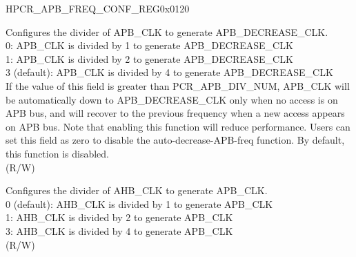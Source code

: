 \begin{register}{H}{PCR\_APB\_FREQ\_CONF\_REG}{0x0120}\label{regdesc:PCRAPBFREQCONFREG}
%
%
%
\regnewline%
\begin{regdesc}\begin{reglist}
 \label{fielddesc:PCRAPBDECREASEDIVNUM}\item [PCR\_APB\_DECREASE\_DIV\_NUM] Configures the divider of APB\_CLK to generate APB\_DECREASE\_CLK.\\
 0: APB\_CLK is divided by 1 to generate APB\_DECREASE\_CLK\\
 1: APB\_CLK is divided by 2 to generate APB\_DECREASE\_CLK\\
 3 (default): APB\_CLK is divided by 4 to generate APB\_DECREASE\_CLK\\
 If the value of this field is greater than PCR\_APB\_DIV\_NUM, APB\_CLK will be automatically down to APB\_DECREASE\_CLK only when no access is on APB bus, and will recover to the previous frequency when a new access appears on APB bus. Note that enabling this function will reduce performance. Users can set this field as zero to disable the auto-decrease-APB-freq function. By default, this function is disabled. 
 \\(R/W)
\label{fielddesc:PCRAPBDIVNUM}\item [PCR\_APB\_DIV\_NUM] Configures the divider of AHB\_CLK to generate APB\_CLK.\\
0 (default): AHB\_CLK is divided by 1 to generate APB\_CLK\\
1: AHB\_CLK is divided by 2 to generate APB\_CLK\\
3: AHB\_CLK is divided by 4 to generate APB\_CLK\\

(R/W)
\end{reglist}\end{regdesc}
\end{register}


